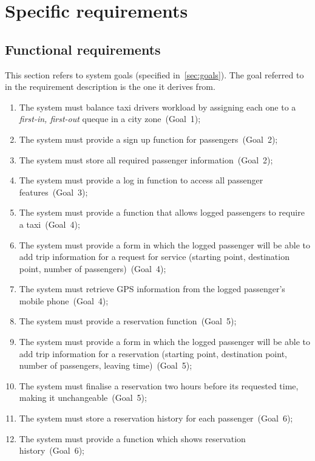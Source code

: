 \chapter{Specific requirements}

\section{Functional requirements}
\label{sec:requirements}
This section refers to system goals (specified in~\autoref{sec:goals}). The goal referred to in the requirement description is the one it derives from.

\begin{enumerate}

\item The system must balance taxi drivers workload by assigning each one to a \emph{first-in, first-out} queque in a city zone~(Goal~1);

\item The system must provide a sign up function for passengers~(Goal~2);
\item The system must store all required passenger information~(Goal~2); 

\item The system must provide a log in function to access all passenger features~(Goal~3);

\item The system must provide a function that allows logged passengers to require a taxi~(Goal~4);
\item The system must provide a form in which the logged passenger will be able to add trip information for a request for service (starting point, destination point, number of passengers)~(Goal~4);
\item The system must retrieve GPS information from the logged passenger's mobile phone~(Goal~4);

\item The system must provide a reservation function~(Goal~5);
\item The system must provide a form in which the logged passenger will be able to add trip information for a reservation (starting point, destination point, number of passengers, leaving time)~(Goal~5);
\item The system must finalise a reservation two hours before its requested time, making it unchangeable~(Goal~5);

\item The system must store a reservation history for each passenger~(Goal~6);
\item The system must provide a function which shows reservation history~(Goal~6);


\end{enumerate}
